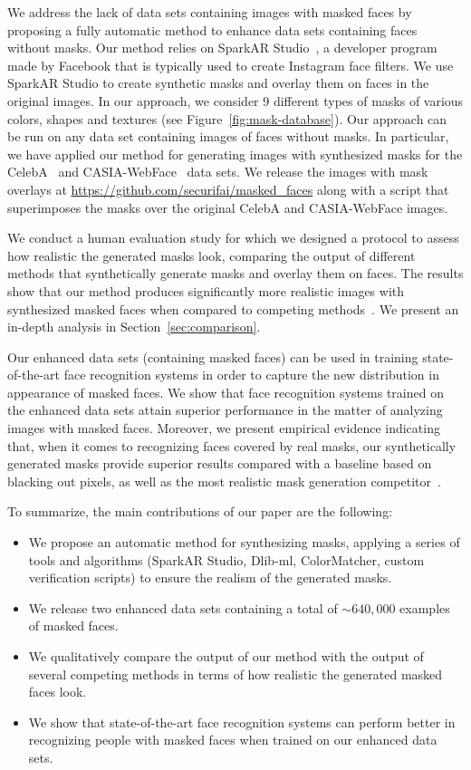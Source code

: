 \documentclass{article}
\begin{document}
We address the lack of data sets containing images with masked faces by proposing a fully automatic method to enhance data sets containing faces without masks. Our method relies on SparkAR Studio~\cite{spark-ar-studio}, a developer program made by Facebook that is typically used to create Instagram face filters. We use SparkAR Studio to create synthetic masks and overlay them on faces in the original images. In our approach, we consider $9$ different types of masks of various colors, shapes and textures (see Figure~\ref{fig:mask-database}). Our approach can be run on any data set containing images of faces without masks. In particular, we have applied our method for generating images with synthesized masks for the CelebA~\cite{Liu2015ICCV} and CASIA-WebFace~\cite{yi2014learning} data sets. We release the images with mask overlays at {\small \url{https://github.com/securifai/masked_faces}} along with a script that superimposes the masks over the original CelebA and CASIA-WebFace images. 

We conduct a human evaluation study for which we designed a protocol to assess how realistic the generated masks look, comparing the output of different methods that synthetically generate masks and overlay them on faces. The results show that our method produces significantly more realistic images with synthesized masked faces when compared to competing methods~\cite{wang2020arxiv,anwar2020arxiv,huang2021icassp}. 
We present an in-depth analysis in Section~\ref{sec:comparison}. 

Our enhanced data sets (containing masked faces) can be used in training state-of-the-art face recognition systems in order to capture the new distribution in appearance of masked faces. We show that face recognition systems trained on the enhanced data sets attain superior performance in the matter of analyzing images with masked faces. Moreover, we present empirical evidence indicating that, when it comes to recognizing faces covered by real masks, our synthetically generated masks provide superior results compared with a baseline based on blacking out pixels, as well as the most realistic mask generation competitor~\cite{anwar2020arxiv}.

To summarize, the main contributions of our paper are the following: 
\begin{itemize}
    \item We propose an automatic method for synthesizing masks, applying a series of tools and algorithms (SparkAR Studio, Dlib-ml, ColorMatcher, custom verification scripts) to ensure the realism of the generated masks.
    \item We release two enhanced data sets containing a total of $\sim\!640,000$ examples of masked faces.
    \item We qualitatively compare the output of our method with the output of several competing methods in terms of how realistic the generated masked faces look.
    \item We show that state-of-the-art face recognition systems can perform better in recognizing people with masked faces when trained on our enhanced data sets.
\end{itemize}
\end{document}

